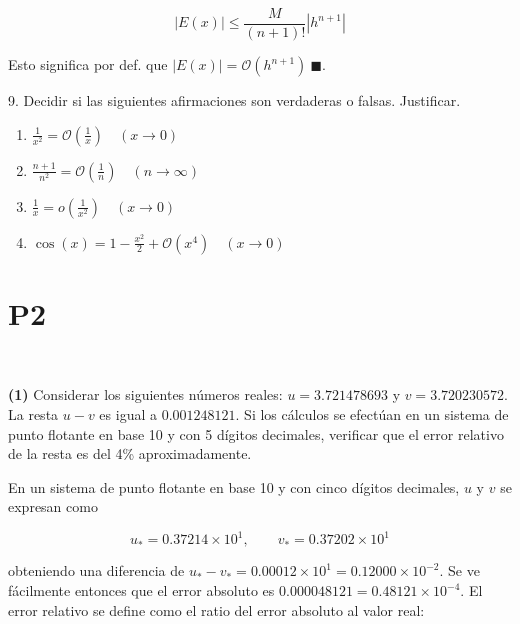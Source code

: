 \documentclass[12pt]{article}
\begin{document}
\begin{equation*}
    |E(x)| \leq \frac{M}{(n+1)!} \left| h^{n+1} \right| 
\end{equation*}

Esto significa por def. que $\left| E(x) \right| = \mathcal{O}(h^{n+1}) ~
\blacksquare$.

\pagebreak 

\begin{myframe}
    9. Decidir si las siguientes afirmaciones son verdaderas o falsas.
    Justificar.

\begin{enumerate}
    \item $\displaystyle \frac{1}{x^2} = \mathcal{O}\left( \frac{1}{x} \right) \quad (x \to 0)$
    \item $\displaystyle \frac{n+1}{n^2} = \mathcal{O}\left( \frac{1}{n} \right) \quad (n \to \infty)$
    \item $\displaystyle \frac{1}{x} = o\left( \frac{1}{x^2} \right) \quad (x \to 0)$
    \item $\displaystyle \cos(x) = 1 - \frac{x^2}{2} + \mathcal{O}(x^4) \quad (x \to 0)$
\end{enumerate}
\end{myframe}

\pagebreak 

\section{P2}

~ 

\begin{myframe}
    \textbf{(1)} Considerar los siguientes números reales: $u = 3.721478693$ y $v =
    3.720230572$. La resta $u - v$ es igual a $0.001248121$. Si los cálculos se
    efectúan en un sistema de punto flotante en base 10 y con 5 dígitos
    decimales, verificar que el error relativo de la resta es del 4\%
    aproximadamente.
\end{myframe}


En un sistema de punto flotante en base 10 y con cinco dígitos decimales, $u$ y
$v$ se expresan como

\begin{equation*}
    u_* = 0.37214 \times 10^1, \qquad v_* = 0.37202 \times 10^1
\end{equation*}

obteniendo una diferencia de $u_* - v_* = 0.00012 \times 10^1 = 0.12000 \times
10^{-2}$. Se ve fácilmente
entonces que el error absoluto es $0.000048121 = 0.48121 \times 10^{-4}$. El
error relativo se define como el ratio del error absoluto al valor real:
\end{document}
